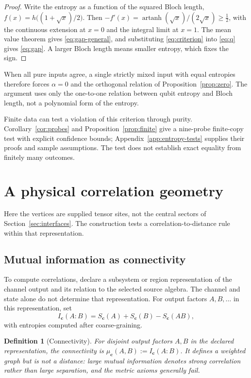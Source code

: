 \documentclass[12pt,a4paper]{article}
\newtheorem{definition}[theorem]{Definition}
\begin{document}
\begin{proof}
Write the entropy as a function of the squared Bloch length, $f(x)=h\bigl((1+\sqrt x)/2\bigr)$. Then $-f'(x)=\operatorname{artanh}(\sqrt x)/(2\sqrt x)\ge\tfrac12$, with the continuous extension at $x=0$ and the integral limit at $x=1$. The mean value theorem gives \eqref{eq:gap-general}, and substituting \eqref{eq:criterion} into \eqref{eq:q} gives \eqref{eq:gap}. A larger Bloch length means smaller entropy, which fixes the sign.
\end{proof}

When all pure inputs agree, a single strictly mixed input with equal entropies therefore forces $\alpha=0$ and the orthogonal relation of Proposition~\ref{prop:zero}. The argument uses only the one-to-one relation between qubit entropy and Bloch length, not a polynomial form of the entropy.

Finite data can test a violation of this criterion through purity.
Corollary~\ref{cor:probes} and Proposition~\ref{prop:finite} give a
nine-probe finite-copy test with explicit confidence bounds;
Appendix~\ref{app:entropy-tests} supplies their proofs and sample
assumptions. The test does not establish exact equality from
finitely many outcomes.

\section{A physical correlation geometry}
\label{sec:geometry}

Here the vertices are supplied tensor sites, not the central sectors
of Section~\ref{sec:interfaces}. The construction tests a
correlation-to-distance rule within that representation.

\subsection{Mutual information as connectivity}

To compute correlations, declare a subsystem or region representation
of the channel output and its relation to the selected source algebra.
The channel and state alone do not determine that representation.
For output factors $A,B,\dots$ in this representation, set
\[
I_{\mathbf c}(A:B)=S_{\mathbf c}(A)+S_{\mathbf c}(B)-S_{\mathbf c}(AB),
\]
with entropies computed after coarse-graining.

\begin{definition}[Connectivity]
\label{def:connectivity}
For disjoint output factors $A,B$ in the declared representation,
the connectivity is $\mu_{\mathbf c}(A,B):=I_{\mathbf c}(A:B)$.
It defines a weighted graph but is not a distance: large mutual
information denotes strong correlation rather than large separation,
and the metric axioms generally fail.
\end{definition}
\end{document}
